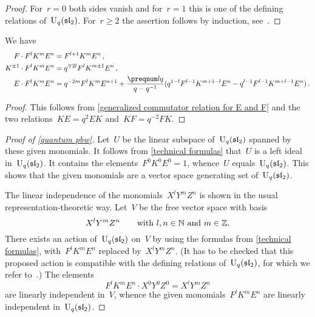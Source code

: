 \documentclass[a4paper, 11pt, oneside]{scrartcl}
\begin{document}
\begin{proof}
  For~$r = 0$ both sides vanish and for~$r = 1$ this is one of the defining relations of~$\operatorname{U}_q(\mathfrak{sl}_2)$.
  For~$r \geq 2$ the assertion follows by induction, see~\cite[Appendix 1.3~(5)]{jantzen_quantum}.
\end{proof}

\begin{corollary}
  \label{technical formulas}
  We have
  \begin{align*}
    F \cdot F^l K^m E^n
    &=
    F^{l+1} K^m E^n \,,
    \\
    K^{\pm 1} \cdot F^l K^m E^n
    &=
    q^{\mp 2l} F^l K^{m \pm 1} E^n \,,
    \\
    E \cdot F^l K^m E^n
    &=
    q^{-2m} F^l K^m E^{n+1}
    +
    \frac{\qnum{l}}{q - q^{-1}}
    (
      q^{1-l} F^{l-1} K^{m + 1-l} E^n
      -
      q^{l-1} F^{l-1} K^{m + l-1} E^n
    ) \,.
  \end{align*}
\end{corollary}

\begin{proof}
  This follows from \cref{generalized commutator relation for E and F} and the two relations~$KE = q^2 EK$ and~$KF = q^{-2} FK$.
\end{proof}

\begin{proof}[Proof of \cref{quantum pbw}]
  Let~$U$ be the linear subspace of~$\operatorname{U}_q(\mathfrak{sl}_2)$ spanned by these given monomials. 
  It follows from \cref{technical formulas} that~$U$ is a left ideal in~$\operatorname{U}_q(\mathfrak{sl}_2)$.
  It contains the elements~$F^0 K^0 E^0 = 1$, whence~$U$ equals~$\operatorname{U}_q(\mathfrak{sl}_2)$.
  This shows that the given monomials are a vector space generating set of~$\operatorname{U}_q(\mathfrak{sl}_2)$.

  The linear independence of the monomials~$X^l Y^m Z^n$ is shown in the usual representation-theoretic way.
  Let~$V$ be the free vector space with basis
  \[
    X^l Y^m Z^n
    \qquad
    \text{with~$l, n \in \mathbb{N}$ and~$m \in \mathbb{Z}$}.
  \]
  There exists an action of~$\operatorname{U}_q(\mathfrak{sl}_2)$ on~$V$ by using the formulas from \cref{technical formulas}, with~$F^l K^m E^n$ replaced by~$X^l Y^m Z^n$.
  (It has to be checked that this proposed action is compatible with the defining relations of~$\operatorname{U}_q(\mathfrak{sl}_2)$, for which we refer to~\cite[Appendix 1.5]{jantzen_quantum}.)
  The elements
  \[
    F^l K^m E^n \cdot X^0 Y^0 Z^0
    =
    X^l Y^m Z^n
  \]
  are linearly independent in~$V$, whence the given monomials~$F^l K^m E^n$ are linearly independent in~$\operatorname{U}_q(\mathfrak{sl}_2)$.
\end{proof}
\end{document}
